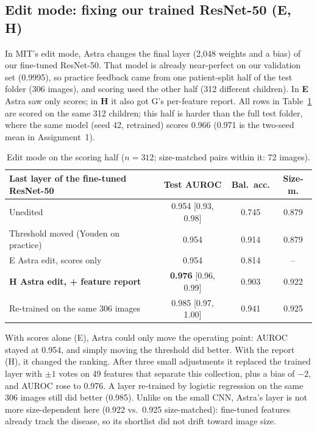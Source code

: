 \subsection{Edit mode: fixing our trained ResNet-50 (E, H)}\label{sec:edit}
In MIT's edit mode, Astra changes the final layer (2,048 weights and a bias) of our fine-tuned ResNet-50.
That model is already near-perfect on our validation set (0.9995), so practice feedback came from one patient-split half of the test folder (306 images), and scoring used the other half (312 different children).
In \textbf{E} Astra saw only scores; in \textbf{H} it also got G's per-feature report.
All rows in Table~\ref{tab:edit} are scored on the same 312 children; this half is harder than the full test folder, where the same model (seed 42, retrained) scores 0.966 (0.971 is the two-seed mean in Assignment~1).
\begin{table}[h]
\centering
\caption{Edit mode on the scoring half ($n{=}312$; size-matched pairs within it: 72 images).}
\label{tab:edit}
\setlength{\tabcolsep}{2.4pt}
\footnotesize
\begin{tabular}{@{}lccc@{}}
\toprule
Last layer of the fine-tuned ResNet-50 & Test AUROC & Bal.\ acc. & Size-m. \\
\midrule
Unedited & 0.954 {\scriptsize[0.93, 0.98]} & 0.745 & 0.879 \\
Threshold moved (Youden on practice) & 0.954 & 0.914 & 0.879 \\
E\; Astra edit, scores only & 0.954 & 0.814 & -- \\
\textbf{H\; Astra edit, + feature report} & \textbf{0.976} {\scriptsize[0.96, 0.99]} & 0.903 & 0.922 \\
Re-trained on the same 306 images & 0.985 {\scriptsize[0.97, 1.00]} & 0.941 & 0.925 \\
\bottomrule
\end{tabular}
\end{table}
With scores alone (E), Astra could only move the operating point: AUROC stayed at 0.954, and simply moving the threshold did better.
With the report (H), it changed the ranking.
After three small adjustments it replaced the trained layer with $\pm1$ votes on 49 features that separate this collection, plus a bias of $-2$, and AUROC rose to 0.976.
A layer re-trained by logistic regression on the same 306 images still did better (0.985).
Unlike on the small CNN, Astra's layer is not more size-dependent here (0.922 vs.\ 0.925 size-matched): fine-tuned features already track the disease, so its shortlist did not drift toward image size.

